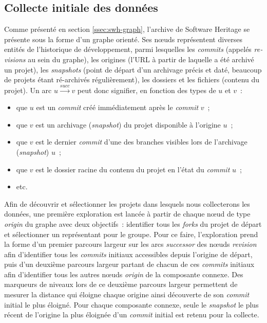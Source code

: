 \documentclass[dvipsnames]{llncs}
\newcommand{\en}[1]{\foreignlanguage{english}{\emph{#1}}}
\begin{document}
    \subsection{Collecte initiale des données}

    Comme présenté en section \ref{ssec:swh-graph}, l'archive de Software Heritage se présente sous la forme
    d'un graphe orienté. Ses nœuds représentent diverses entités de l'historique de développement, parmi
    lesquelles les \en{commits} (appelés \en{revisions} au sein du graphe), les origines (l'URL à partir de
    laquelle a été archivé un projet), les \en{snapshots} (point de départ d'un archivage précis et daté,
    beaucoup de projets étant ré-archivés régulièrement), les dossiers et les fichiers (contenu du projet). Un
    arc $u \xrightarrow{succ} v$ peut donc signifier, en fonction des types de $u$ et $v$ : 

    \begin{itemize}
        \item que $u$ est un \en{commit} créé immédiatement après le \en{commit} $v$ ;
        \item que $v$ est un archivage (\en{snapshot}) du projet disponible à l'origine $u$ ;
        \item que $v$ est le dernier \en{commit} d'une des branches visibles lors de l'archivage
            (\en{snapshot}) $u$ ;
        \item que $v$ est le dossier racine du contenu du projet en l'état du \en{commit} $u$ ;
        \item etc.
    \end{itemize}

    Afin de découvrir et sélectionner les projets dans lesquels nous collecterons les données, une première
    exploration est lancée à partir de chaque nœud de type \en{origin} du graphe avec deux objectifs :
    identifier tous les \en{forks} du projet de départ et sélectionner un représentant pour le groupe. Pour ce
    faire, l'exploration prend la forme d'un premier parcours largeur sur les arcs \en{successor} des nœuds
    \en{revision} afin d'identifier tous les \en{commits} initiaux accessibles depuis l'origine de départ, puis
    d'un deuxième parcours largeur partant de chacun de ces \en{commits} initiaux afin d'identifier tous les
    autres nœuds \en{origin} de la composante connexe. Des marqueurs de niveaux lors de ce deuxième parcours
    largeur permettent de mesurer la distance qui éloigne chaque origine ainsi découverte de son \en{commit}
    initial le plus éloigné. Pour chaque composante connexe, seule le \en{snapshot} le plus récent de
    l'origine la plus éloignée d'un \en{commit} initial est retenu pour la collecte.
\end{document}
